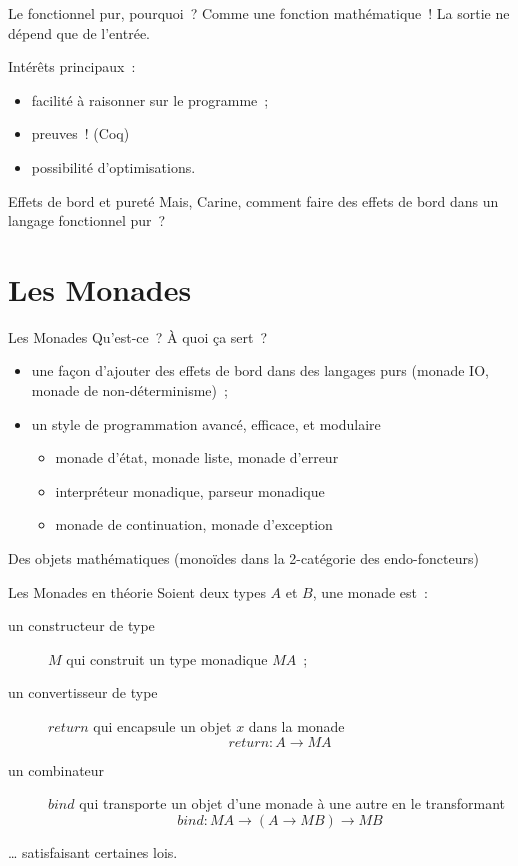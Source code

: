 \documentclass[10pt]{beamer}
\begin{document}
\begin{frame}{Le fonctionnel pur, pourquoi~?}
  Comme une fonction mathématique~! La sortie ne dépend que de
  l'entrée.

  Intérêts principaux~:
  \begin{itemize}
  \item facilité à raisonner sur le programme~;
  \item preuves~! (Coq)
  \item possibilité d'optimisations.
  \end{itemize}
\end{frame}

\begin{frame}{Effets de bord et pureté}
  Mais, Carine, comment faire des effets de bord dans un langage
  fonctionnel pur~?
\end{frame}

\section{Les Monades}

\begin{frame}{Les Monades}
  Qu'est-ce~? À quoi ça sert~?
  \begin{itemize}
  \item une façon d’ajouter des effets de bord dans des langages purs
    (monade IO, monade de non-déterminisme)~;
  \item un style de programmation avancé, efficace, et modulaire
    \begin{itemize}
    \item monade d'état, monade liste, monade d'erreur
    \item interpréteur monadique, parseur monadique
    \item monade de continuation, monade d'exception
    \end{itemize}
  \end{itemize}

  Des objets mathématiques (monoïdes dans la 2-catégorie des
  endo-foncteurs)
\end{frame}

\begin{frame}{Les Monades en théorie}
  Soient deux types $A$ et $B$, une monade est~:
  \begin{description}
  \item[un constructeur de type] $M$ qui construit un type monadique
    $M A$~;
  \item[un convertisseur de type]
    $return$ qui encapsule un objet $x$ dans la monade
    \[ return : A \to M A \]
  \item[un combinateur] $bind$ qui transporte un objet d'une monade à
    une autre en le transformant
    \[ bind : M A \to (A \to M B) \to M B \]
  \end{description}
  … satisfaisant certaines lois.
\end{frame}
\end{document}
